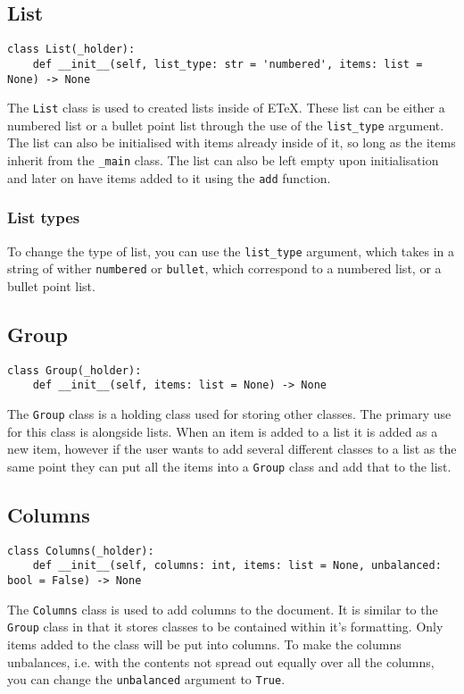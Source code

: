 \documentclass{article}
\begin{document}
\subsection{List}\label{subsec:list}
\begin{verbatim}
class List(_holder):
	def __init__(self, list_type: str = 'numbered', items: list = None) -> None
\end{verbatim}
The \verb|List| class is used to created lists inside of ETeX. These list can be either a numbered list or a bullet point list through the use of the \verb|list_type| argument. The list can also be initialised with items already inside of it, so long as the items inherit from the \verb|_main| class. The list can also be left empty upon initialisation and later on have items added to it using the \verb|add| function.
\subsubsection{List types}\label{subsubsec:list_types}
To change the type of list, you can use the \verb|list_type| argument, which takes in a string of wither \verb|numbered| or \verb|bullet|, which correspond to a numbered list, or a bullet point list.
\subsection{Group}\label{subsec:group}
\begin{verbatim}
class Group(_holder):
	def __init__(self, items: list = None) -> None
\end{verbatim}
The \verb|Group| class is a holding class used for storing other classes. The primary use for this class is alongside lists. When an item is added to a list it is added as a new item, however if the user wants to add several different classes to a list as the same point they can put all the items into a \verb|Group| class and add that to the list.
\subsection{Columns}\label{subsec:columns}
\begin{verbatim}
class Columns(_holder):
	def __init__(self, columns: int, items: list = None, unbalanced: bool = False) -> None
\end{verbatim}
The \verb|Columns| class is used to add columns to the document. It is similar to the \verb|Group| class in that it stores classes to be contained within it's formatting. Only items added to the class will be put into columns. To make the columns unbalances, i.e. with the contents not spread out equally over all the columns, you can change the \verb|unbalanced| argument to \verb|True|.
\end{document}
